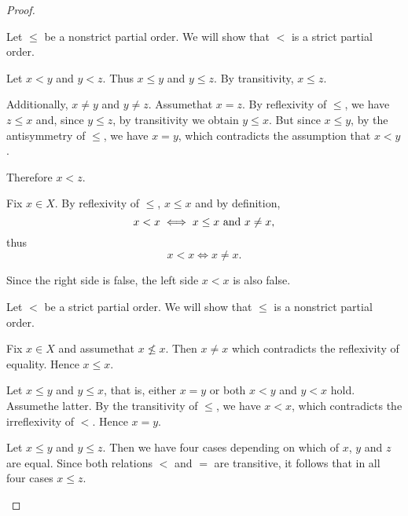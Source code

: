 \begin{proof}
  \begin{description}
     Let \( \leq \) be a nonstrict partial order. We will show that \( < \) is a strict partial order.
    \begin{description}
       Let \( x < y \) and \( y < z \). Thus \( x \leq y \) and \( y \leq z \). By transitivity, \( x \leq z \).

      Additionally, \( x \neq y \) and \( y \neq z \). Assume\LEM that \( x = z \). By reflexivity of \( \leq \), we have \( z \leq x \) and, since \( y \leq z \), by transitivity we obtain \( y \leq x \). But since \( x \leq y \), by the antisymmetry of \( \leq \), we have \( x = y \), which contradicts the assumption that \( x < y \).

      Therefore \( x < z \).

       Fix \( x \in X \). By reflexivity of \( \leq \), \( x \leq x \) and by definition,
      \begin{equation*}
        x < x \iff x \leq x \text{ and } x \neq x,
      \end{equation*}
      thus
      \begin{equation*}
        x < x \iff x \neq x.
      \end{equation*}

      Since the right side is false, the left side \( x < x \) is also false.
    \end{description}

     Let \( < \) be a strict partial order. We will show that \( \leq \) is a nonstrict partial order.
    \begin{description}
       Fix \( x \in X \) and assume\LEM that \( x \not\leq x \). Then \( x \neq x \) which contradicts the reflexivity of equality. Hence \( x \leq x \).

       Let \( x \leq y \) and \( y \leq x \), that is, either \( x = y \) or both \( x < y \) and \( y < x \) hold. Assume\LEM the latter. By the transitivity of \( \leq \), we have \( x < x \), which contradicts the irreflexivity of \( < \). Hence \( x = y \).

       Let \( x \leq y \) and \( y \leq z \). Then we have four cases depending on which of \( x \), \( y \) and \( z \) are equal. Since both relations \( < \) and \( = \) are transitive, it follows that in all four cases \( x \leq z \).
    \end{description}
  \end{description}
\end{proof}

